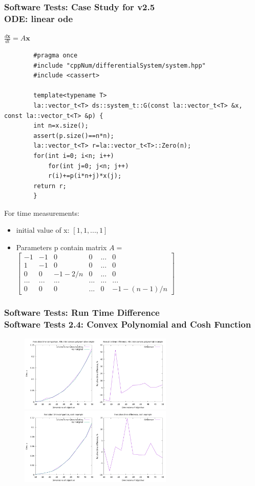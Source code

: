 \documentclass[ucs,10pt]{beamer}
\begin{document}
\begin{frame}[fragile]
\frametitle{Software Tests: Case Study for v2.5 \\
	\small \color{rwth-blue} ODE: linear ode}
	$\frac{d\mathbf{x}}{dt} = A \mathbf{x}$

	\begin{lstlisting}
		#pragma once
		#include "cppNum/differentialSystem/system.hpp"
		#include <cassert>
		
		template<typename T>
		la::vector_t<T> ds::system_t::G(const la::vector_t<T> &x, const la::vector_t<T> &p) {
		int n=x.size();
		assert(p.size()==n*n);
		la::vector_t<T> r=la::vector_t<T>::Zero(n);
		for(int i=0; i<n; i++)
			for(int j=0; j<n; j++)
			r(i)+=p(i*n+j)*x(j);
		return r;
		}
	\end{lstlisting}
	 For time measurements:
        \begin{itemize}
            \item initial value of x: $[1, 1, ..., 1]$
			\item Parameters p contain matrix $A=$
			{\tiny
			$\begin{bmatrix}
				-1 & -1 & 0 & 0 &... & 0\\
				1 & -1 & 0 & 0 &... & 0\\
				0 & 0 & -1-2/n & 0 & ... & 0\\
				... & ... & ... & ... & ... & ...\\
				0 & 0 & 0 & ... & 0 & -1-(n-1)/n 
			\end{bmatrix}$}
        \end{itemize}
\end{frame}
	
\begin{frame}
\frametitle{Software Tests: Run Time Difference \\
	\small \color{rwth-blue} Software Tests 2.4: Convex Polynomial and Cosh Function}
	\begin{figure}
		\centering
		\includegraphics[width=0.65\textwidth]{figures/2.4_4th_order_convex_polynomial.png}
		\vspace{0.3cm}
		\includegraphics[width=0.65\textwidth]{figures/2.4_cosh.png}
	\end{figure}
\end{frame}
	
\end{document}
